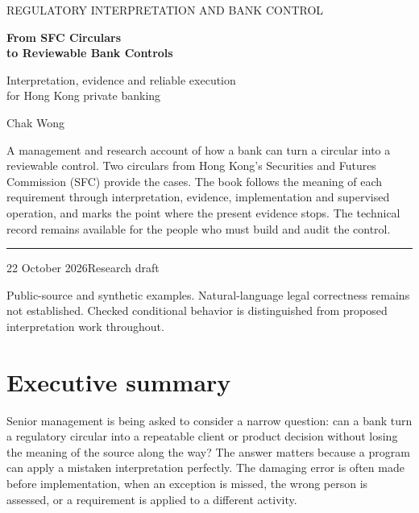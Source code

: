 \documentclass[12pt,a4paper,oneside,openany]{book}
\begin{document}
\raggedbottom
\frontmatter
\hypersetup{pageanchor=false}
\begin{titlepage}
\vspace*{15mm}
{\sffamily\color{teal}\large REGULATORY INTERPRETATION AND BANK CONTROL\par}
\vspace{12mm}
{\sffamily\bfseries\color{navy}\fontsize{32}{37}\selectfont From SFC Circulars\\to Reviewable Bank Controls\par}
\vspace{12mm}
{\Large Interpretation, evidence and reliable execution\\for Hong Kong private banking\par}
\vspace{12mm}
{\large Chak Wong\par}
\vfill
\begin{minipage}{0.94\textwidth}
A management and research account of how a bank can turn a circular into a
reviewable control. Two circulars from Hong Kong's Securities and Futures
Commission (SFC) provide the cases. The book follows the
meaning of each requirement through interpretation, evidence, implementation
and supervised operation, and marks the point where the present evidence stops.
The technical record remains available for the people who must build and audit
the control.
\end{minipage}
\vspace{16mm}
\hrule
\vspace{5mm}
22 October 2026\hfill Research draft\par
\small Public-source and synthetic examples. Natural-language legal correctness
remains not established. Checked conditional behavior is distinguished from
proposed interpretation work throughout.
\end{titlepage}
\hypersetup{pageanchor=true}
\chapter*{Executive summary}
Senior management is being asked to consider a narrow question: can a bank turn
a regulatory circular into a repeatable client or product decision without
losing the meaning of the source along the way? The answer matters because a
program can apply a mistaken interpretation perfectly. The damaging error is
often made before implementation, when an exception is missed, the wrong person
is assessed, or a requirement is applied to a different activity.
\end{document}
